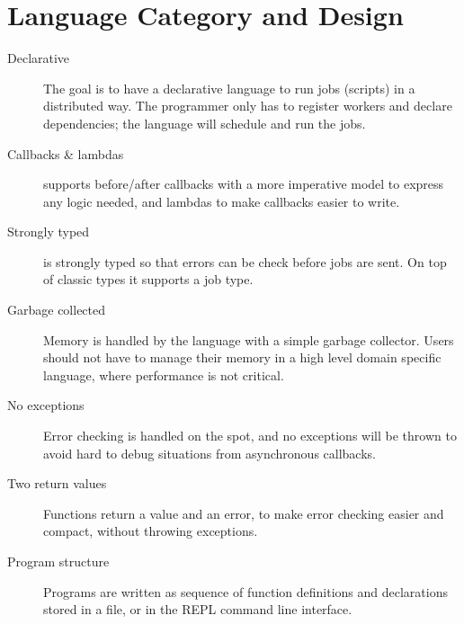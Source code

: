 \section{Language Category and Design}
\label{sect:desg}
\begin{description}
\item[Declarative] The goal is to have a declarative language to run jobs
(scripts) in a distributed way. The programmer only has to register workers and
declare dependencies; the language will schedule and run the jobs.
\item[Callbacks \& lambdas] \lang{} supports before/after callbacks
with a more imperative model to express any logic needed, and
lambdas to make callbacks easier to write.
\item[Strongly typed] \lang{} is strongly typed so that errors can be check
before jobs are sent. On top of classic types it supports a job type.
\item[Garbage collected] Memory is handled by the language with a simple
garbage collector. Users should not have to manage their memory in a high
level domain specific language, where performance is not critical.
\item[No exceptions] Error checking is handled on the spot, and no exceptions
will be thrown to avoid hard to debug situations from asynchronous callbacks.
\item[Two return values] Functions return a value and an error, to make error
checking easier and compact, without throwing exceptions.
\item[Program structure] Programs are written as sequence of function
definitions and declarations stored in a file, or in the REPL command line
interface.
\end{description}
